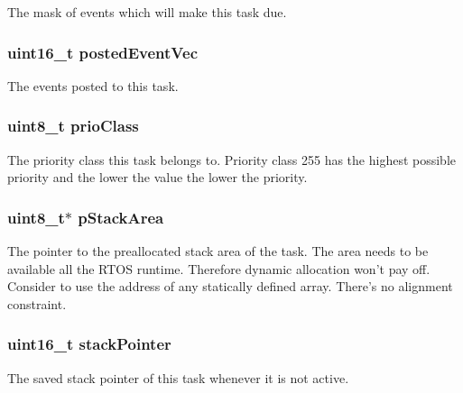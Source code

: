 The mask of events which will make this task due. \hypertarget{structtask__t_aaf032c29bc60c586e9a33d91b21f6fa4}{
\subsubsection[{posted\-Event\-Vec}]{\setlength{\rightskip}{0pt plus 5cm}uint16\-\_\-t posted\-Event\-Vec}}\label{structtask__t_aaf032c29bc60c586e9a33d91b21f6fa4}
The events posted to this task. \hypertarget{structtask__t_a5f71b4873dad334e5ec93aec6cea1d23}{
\subsubsection[{prio\-Class}]{\setlength{\rightskip}{0pt plus 5cm}uint8\-\_\-t prio\-Class}}\label{structtask__t_a5f71b4873dad334e5ec93aec6cea1d23}
The priority class this task belongs to. Priority class 255 has the highest possible priority and the lower the value the lower the priority. \hypertarget{structtask__t_a5edd85b979fc31ec0b53347a0e67429c}{
\subsubsection[{p\-Stack\-Area}]{\setlength{\rightskip}{0pt plus 5cm}uint8\-\_\-t$\ast$ p\-Stack\-Area}}\label{structtask__t_a5edd85b979fc31ec0b53347a0e67429c}
The pointer to the preallocated stack area of the task. The area needs to be available all the R\-T\-O\-S runtime. Therefore dynamic allocation won't pay off. Consider to use the address of any statically defined array. There's no alignment constraint. \hypertarget{structtask__t_a760a32c332e502fe421256fce4f7d9d8}{
\subsubsection[{stack\-Pointer}]{\setlength{\rightskip}{0pt plus 5cm}uint16\-\_\-t stack\-Pointer}}\label{structtask__t_a760a32c332e502fe421256fce4f7d9d8}
The saved stack pointer of this task whenever it is not active.\par
